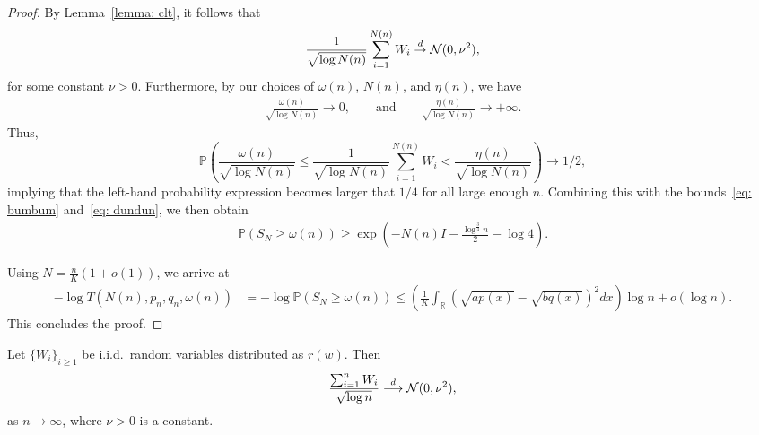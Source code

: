 \begin{proof}
By Lemma~\ref{lemma: clt}, it follows that
$$\frac{1}{\sqrt {\log N(n)}}\sum_{i=1}^{N(n)} W_i \stackrel{d}\to {\mathcal N}(0, \nu^2),$$
for some constant $\nu > 0$. Furthermore, by our choices of $\omega(n)$, $N(n)$, and $\eta(n)$, we have 
\begin{align*}
\frac{\omega(n)}{\sqrt{\log N(n)}} \to 0, \qquad \text{and} \qquad \frac{\eta(n)}{\sqrt{\log N(n)}} \to +\infty.
\end{align*}
Thus, 
\begin{equation*}
 \mathbb P\left(\frac{\omega(n)}{\sqrt{\log N(n)}} \leq \frac{1}{\sqrt {\log N(n)}}\sum_{i=1}^{N(n)} W_i < \frac{\eta(n)}{\sqrt{\log N(n)}} \right) \to 1/2,
\end{equation*}
implying that the left-hand probability expression becomes larger that $1/4$ for all large enough $n$.
Combining this with the bounds~\eqref{eq: bumbum} and~\eqref{eq: dundun}, we then obtain
\begin{align*}
\mathbb P(S_N \geq \omega(n)) \geq \exp \left(-N(n)I - \frac{\log^{\frac{3}{4}} n}{2} - \log 4 \right).
\end{align*}

Using $N = \frac{n}{K}(1+o(1))$, we arrive at
\begin{align*}
-\log T\left(N(n), p_n, q_n, \omega(n)\right) &= -\log \mathbb P(S_N \geq \omega(n)) \leq \left(\frac{1}{K}\int_{\mathbb R}  \left(\sqrt{ap(x)} - \sqrt{bq(x)}\right)^2 dx\right)  \log n+ o(\log n).
\end{align*}
This concludes the proof.

\end{proof}



\begin{lemma}
\label{lemma: clt}
Let $\{W_i\}_{i \geq 1}$ be i.i.d.\ random variables distributed as $r(w)$. Then 
\begin{equation*}
\frac{\sum_{i=1}^n W_i}{\sqrt{\log n}} \stackrel{d}{\longrightarrow} {\mathcal N}(0, \nu^2),
\end{equation*}
as $n \rightarrow \infty$, where $\nu > 0$ is a constant.
\end{lemma}

